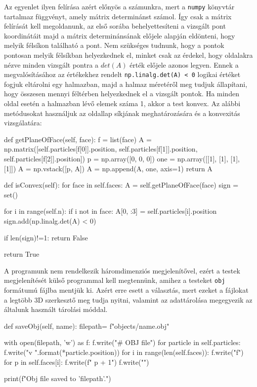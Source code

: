 Az egyenlet ilyen felírása azért előnyös a számunkra, mert a \texttt{numpy} könyvtár tartalmaz függvényt, amely mátrix determinánst számol.
Így csak a mátrix felírását kell megoldanunk, az első sorába behelyettesíteni a vizsgált pont koordinátáit majd a mátrix determinánsának előjele alapján eldönteni, hogy melyik félsíkon található a pont.
Nem szükséges tudnunk, hogy a pontok pontosan melyik félsíkban helyezkednek el, minket csak az érdekel, hogy oldalakra nézve minden vizsgált pontra a $det(A)$ érték előjele azonos legyen.
Ennek a megvalósításához az értékekhez rendelt \texttt{np.linalg.det(A) < 0} logikai értéket fogjuk eltárolni egy halmazban, majd a halmaz méretéről meg tudjuk állapítani, hogy összesen mennyi féltérben helyezkednek el a vizsgált pontok.
Ha minden oldal esetén a halmazban lévő elemek száma 1, akkor a test konvex.
Az alábbi metódusokat használjuk az oldallap síkjának meghatározására és a konvexitás vizsgálatára:

\begin{python}
def getPlaneOfFace(self, face):
    f = list(face)
    A = np.matrix([self.particles[f[0]].position,
                   self.particles[f[1]].position,
                   self.particles[f[2]].position])
    p = np.array([0, 0, 0])
    one = np.array([[1], [1], [1], [1]])
    A = np.vstack([p, A])
    A = np.append(A, one, axis=1)
    return A
    
def isConvex(self):
    for face in self.faces:
        A = self.getPlaneOfFace(face)
        sign = set()

        for i in range(self.n):
            if i not in face:
                A[0, :3] = self.particles[i].position
                sign.add(np.linalg.det(A) < 0)

        if len(sign)!=1:
            return False

    return True
\end{python}


A programunk nem rendelkezik háromdimenziós megjelenítővel, ezért a testek megjelenítését külső programmal kell megtennünk, amihez a testeket \texttt{obj}\cite{wavefrontOBJ} formátumú fájlba mentjük ki.
Azért erre esett a választás, mert ezeket a fájlokat a legtöbb 3D szerkesztő meg tudja nyitni, valamint az adattárolása megegyezik az általunk használt tárolási móddal.

\begin{python}
def saveObj(self, name):
    filepath= f"objects/{name}.obj"

    with open(filepath, 'w') as f:
        f.write("# OBJ file\n")
        for particle in self.particles:
            f.write("v {} {} {}\n".format(*particle.position))
        for i in range(len(self.faces)):
            f.write("f")
            for p in self.faces[i]:
                f.write(f" {p + 1}")
            f.write("\n")

    print(f"Obj file saved to '{filepath}'.")
\end{python}

